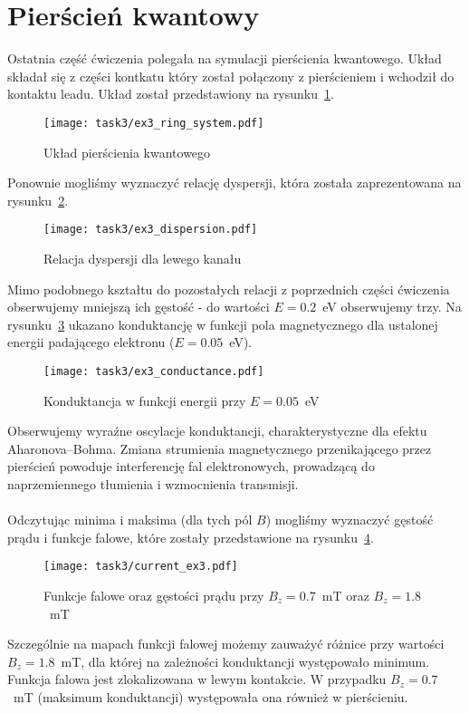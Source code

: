 \documentclass{article}
\begin{document}
\section{Pierścień kwantowy}
Ostatnia część ćwiczenia polegała na symulacji pierścienia kwantowego.
Układ składał się z części kontkatu który został połączony z pierścieniem i wchodził do kontaktu leadu.
Układ został przedstawiony na rysunku~\ref{fig:task3-system}.
\begin{figure}[htp!]
    \centering
    \texttt{[image: task3/ex3\_ring\_system.pdf]}
    \caption{Układ pierścienia kwantowego}
    \label{fig:task3-system}
\end{figure}
Ponownie mogliśmy wyznaczyć relację dyspersji, która została zaprezentowana na rysunku~\ref{fig:task3-disperssion}.
\begin{figure}[htp!]
    \centering
    \texttt{[image: task3/ex3\_dispersion.pdf]}
    \caption{Relacja dyspersji dla lewego kanału}
    \label{fig:task3-disperssion}
\end{figure}
Mimo podobnego kształtu do pozostałych relacji z poprzednich części ćwiczenia obserwujemy mniejszą ich gęstość - do wartości $E = 0.2$~eV obserwujemy trzy.
Na rysunku~\ref{fig:task3-conductance} ukazano konduktancję w funkcji pola magnetycznego dla ustalonej energii padającego elektronu ($E = 0.05$~eV). 
\begin{figure}[htp!]
    \centering
    \texttt{[image: task3/ex3\_conductance.pdf]}
    \caption{Konduktancja w funkcji energii przy $E=0.05$~eV}
    \label{fig:task3-conductance}
\end{figure}
Obserwujemy wyraźne oscylacje konduktancji, charakterystyczne dla efektu Aharonova–Bohma. 
Zmiana strumienia magnetycznego przenikającego przez pierścień powoduje interferencję fal elektronowych, prowadzącą do naprzemiennego tłumienia i wzmocnienia transmisji.\\
\\
Odczytując minima i maksima (dla tych pól $B$) mogliśmy wyznaczyć gęstość prądu i funkcje falowe, które zostały przedstawione na rysunku~\ref{fig:task3-current}.
\begin{figure}[htp!]
    \centering
    \texttt{[image: task3/current\_ex3.pdf]}
    \caption{Funkcje falowe oraz gęstości prądu przy $B_z=0.7$~mT oraz $B_z = 1.8$~mT}
    \label{fig:task3-current}
\end{figure}
Szczególnie na mapach funkcji falowej możemy zauważyć różnice przy wartości $B_z=1.8$~mT, dla której na zależności konduktancji występowało minimum.
Funkcja falowa jest zlokalizowana w lewym kontakcie.
W przypadku $B_z=0.7$~mT (maksimum konduktancji) występowała ona również w pierścieniu.
\end{document}
